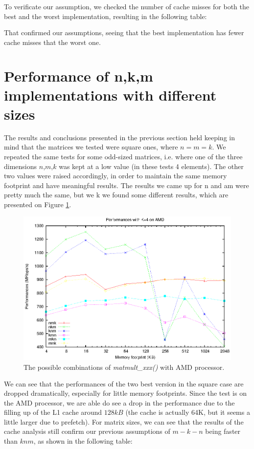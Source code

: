 To verificate our assumption, we checked the number of cache misses for both the best and the worst implementation, resulting in the following table:

That confirmed our assumptions, seeing that the best implementation has fewer cache misses that the worst one.

\section{Performance of n,k,m implementations with different sizes}
The results and conclusions presented in the previous section held keeping in mind that the matrices we tested were square ones, where $n=m=k$. We repeated the same tests for some odd-sized matrices, i.e. where one of the three dimensions $n$,$m$,$k$ was kept at a low value (in these tests 4 elements). The other two values were raised accordingly, in order to maintain the same memory footprint and have meaningful results. The results we came up for n and am were pretty much the same, but we k we found some different results, which are presented on Figure \ref{fig:lowk}.

\begin{figure}[here]
\centering
\includegraphics[width=\textwidth]{results/littlek.eps}
\caption{The possible combinations of \emph{matmult\_xxx()} with AMD processor.}
\label{fig:lowk}
\end{figure}

We can see that the performances of the two best version in the square case are dropped dramatically, especially for little memory footprints. Since the test is on the AMD processor, we are able do see a drop in the performance due to the filling up of the L1 cache around $128kB$ (the cache is actually 64K, but it seems a little larger due to prefetch). For matrix sizes, we can see that the results of the cache analysis still confirm our previous assumptions of $m-k-n$ being faster than $knm$, as shown in the following table:


